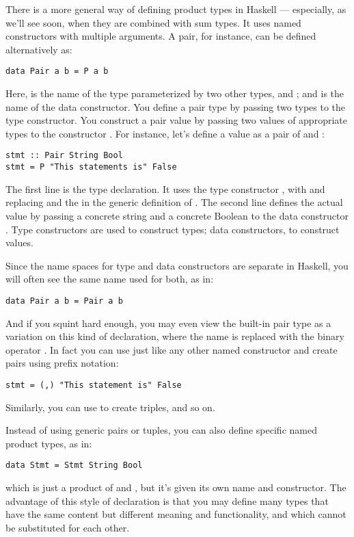 There is a more general way of defining product types in Haskell ---
especially, as we'll see soon, when they are combined with sum types. It
uses named constructors with multiple arguments. A pair, for instance,
can be defined alternatively as:

\begin{Verbatim}
data Pair a b = P a b
\end{Verbatim}
Here,  is the name of the type parameterized by two
other types,  and ; and  is the name of
the data constructor. You define a pair type by passing two types to the
 type constructor. You construct a pair value by passing
two values of appropriate types to the constructor . For
instance, let's define a value  as a pair of
 and :

\begin{Verbatim}
stmt :: Pair String Bool
stmt = P "This statements is" False
\end{Verbatim}
The first line is the type declaration. It uses the type constructor
, with  and  replacing
 and the  in the generic definition of
. The second line defines the actual value by passing a
concrete string and a concrete Boolean to the data constructor
. Type constructors are used to construct types; data
constructors, to construct values.

Since the name spaces for type and data constructors are separate in
Haskell, you will often see the same name used for both, as in:

\begin{Verbatim}
data Pair a b = Pair a b
\end{Verbatim}
And if you squint hard enough, you may even view the built-in pair type
as a variation on this kind of declaration, where the name 
is replaced with the binary operator \code{(,)}. In fact you can use
\code{(,)} just like any other named constructor and create pairs
using prefix notation:

\begin{Verbatim}
stmt = (,) "This statement is" False
\end{Verbatim}
Similarly, you can use \code{(,,)} to create triples, and so on.

Instead of using generic pairs or tuples, you can also define specific
named product types, as in:

\begin{Verbatim}
data Stmt = Stmt String Bool
\end{Verbatim}
which is just a product of  and , but it's
given its own name and constructor. The advantage of this style of
declaration is that you may define many types that have the same content
but different meaning and functionality, and which cannot be substituted
for each other.

